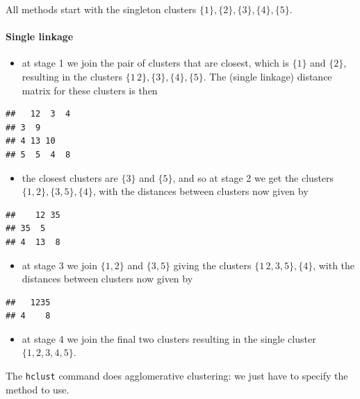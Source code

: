 \documentclass[
]{book}
\providecommand{\tightlist}{%
  \setlength{\itemsep}{0pt}\setlength{\parskip}{0pt}}
\theoremstyle{definition}
\theoremstyle{definition}
\theoremstyle{definition}
\theoremstyle{definition}
\theoremstyle{remark}
\begin{document}
All methods start with the singleton clusters \(\{1\},\{2\},\{3\},\{4\},\{5\}\).

\hypertarget{single-linkage}{%
\paragraph*{Single linkage}\label{single-linkage}}

\begin{itemize}
\tightlist
\item
  at stage 1 we join the pair of clusters that are closest, which is \(\{1\}\) and \(\{2\}\), resulting in the clusters \(\{1\, 2\},\{3\},\{4\},\{5\}\). The (single linkage) distance matrix for these clusters is then
\end{itemize}

\begin{verbatim}
##   12  3  4
## 3  9      
## 4 13 10   
## 5  5  4  8
\end{verbatim}

\begin{itemize}
\tightlist
\item
  the closest clusters are \(\{3\}\) and \(\{5\}\), and so at stage 2
  we get the clusters \(\{1, 2\},\{3, 5\},\{4\}\), with the distances between clusters now given by
\end{itemize}

\begin{verbatim}
##    12 35
## 35  5   
## 4  13  8
\end{verbatim}

\begin{itemize}
\tightlist
\item
  at stage 3 we join \(\{1, 2\}\) and \(\{3, 5\}\) giving the clusters \(\{1\, 2, 3, 5\},\{4\}\), with the distances between clusters now given by
\end{itemize}

\begin{verbatim}
##   1235
## 4    8
\end{verbatim}

\begin{itemize}
\tightlist
\item
  at stage 4 we join the final two clusters resulting in the single cluster \(\{1, 2, 3, 4, 5\}\).
\end{itemize}

The \texttt{hclust} command does agglomerative clustering: we just have to specify the method to use.
\end{document}
